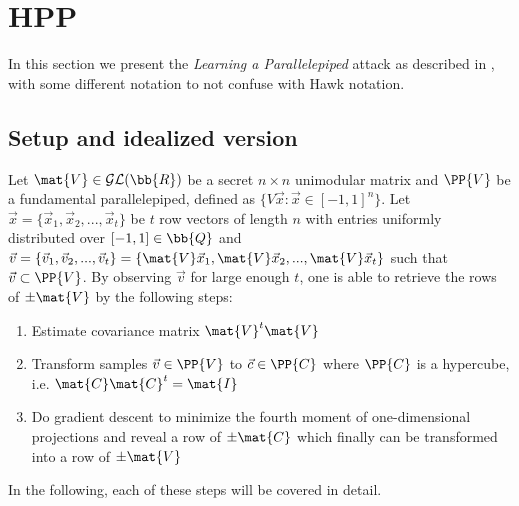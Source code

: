 \newtheorem{lemma}{Lemma}
\newtheorem{proof}{Proof}

\section{HPP}
In this section we present the \textit{Learning a Parallelepiped} attack as described in \cite{NR09}, with some different notation to not confuse with Hawk notation.
\subsection{Setup and idealized version}
Let $\mat{V} \in \mathcal{GL}(\bb{R})$ be a secret $n \times n$ unimodular matrix and $\PP{V}$ be a fundamental parallelepiped, defined as $\{V \vec{x}: \vec{x} \in [-1, 1]^n\}$. Let $\vec{x} = \{\vec{x}_1, \vec{x}_2, ...,\vec{x}_t\}$
be $t$ row vectors of length $n$ with entries uniformly distributed over $[-1, 1] \in \bb{Q}$ and $\vec{v} = \{\vec{v}_1, \vec{v}_2, ..., \vec{v}_t\} = \{\mat{V} \vec{x}_1, \mat{V} \vec{x}_2, ..., \mat{V} \vec{x}_t\}$ 
such that $\vec{v} \subset \PP{V}$. By observing $\vec{v}$ for large enough $t$, one is able to retrieve the rows of $\pm \mat{V}$ by the following steps:
\begin{enumerate}
    \item Estimate covariance matrix $\mat{V}^t \mat{V}$
    \item Transform samples $\vec{v} \in \PP{V}$ to $\vec{c} \in \PP{C}$ where $\PP{C}$ is a hypercube, i.e. $\mat{C} \mat{C}^t = \mat{I}$
    \item Do gradient descent to minimize the fourth moment of one-dimensional projections and reveal a row of $\pm \mat{C}$ which finally can be transformed into a row of $\pm \mat{V}$
\end{enumerate}
In the following, each of these steps will be covered in detail.
